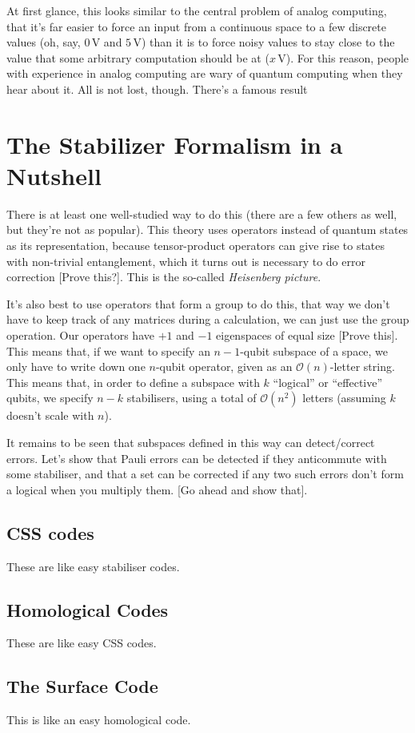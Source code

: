 \documentclass[10pt,a4paper, english]{scrartcl}
\providecommand{\volts}{\, \textrm{V}}
\begin{document}
At first glance, this looks similar to the central problem of analog computing, that it's far easier to force an input from a continuous space to a few discrete values (oh, say, $0 \volts$ and $5 \volts$) than it is to force noisy values to stay close to the value that some arbitrary computation should be at ($x \volts$). 
For this reason, people with experience in analog computing are wary of quantum computing when they hear about it. 
All is not lost, though. 
There's a famous result 
\section{The Stabilizer Formalism in a Nutshell}
There is at least one well-studied way to do this (there are a few others as well, but they're not as popular).
This theory uses operators instead of quantum states as its representation, because tensor-product operators can give rise to states with non-trivial entanglement, which it turns out is necessary to do error correction [Prove this?].
This is the so-called \emph{Heisenberg picture}. 

It's also best to use operators that form a group to do this, that way we don't have to keep track of any matrices during a calculation, we can just use the group operation. 
Our operators have $+1$ and $-1$ eigenspaces of equal size [Prove this]. 
This means that, if we want to specify an $n-1$-qubit subspace of a space, we only have to write down one $n$-qubit operator, given as an $\mathcal{O}(n)$-letter string. 
This means that, in order to define a subspace with $k$ ``logical'' or ``effective'' qubits, 
we specify $n-k$ stabilisers, using a total of $\mathcal{O}(n^2)$ letters (assuming $k$ doesn't scale with $n$).

It remains to be seen that subspaces defined in this way can detect/correct errors.
Let's show that Pauli errors can be detected if they anticommute with some stabiliser, and that a set can be corrected if any two such errors don't form a logical when you multiply them.
[Go ahead and show that].
\subsection{CSS codes}
These are like easy stabiliser codes.
\subsection{Homological Codes}
These are like easy CSS codes.
\subsection{The Surface Code}
This is like an easy homological code.
\end{document}
